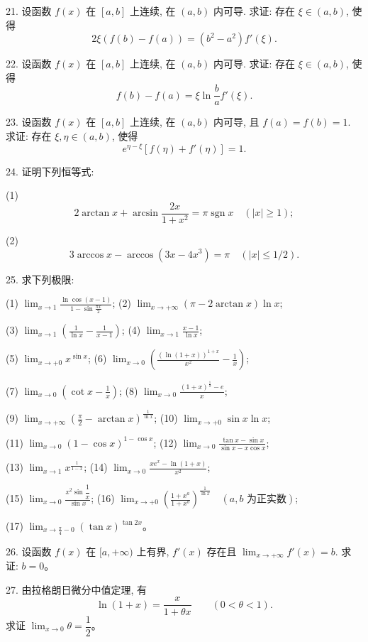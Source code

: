 \documentclass[UTF8,12pt,a4paper,fontset=fandol]{ctexart}
\begin{document}
21. 设函数 $f(x)$ 在 $[a,b]$ 上连续, 在 $(a,b)$ 内可导. 求证: 存在 $\xi\in(a,b)$, 使得
\[
  2\xi(f(b)-f(a))=(b^2-a^2)f'(\xi).
\]

22. 设函数 $f(x)$ 在 $[a,b]$ 上连续, 在 $(a,b)$ 内可导. 求证: 存在 $\xi\in(a,b)$, 使得
\[
  f(b)-f(a)=\xi\ln\frac ba f'(\xi).
\]

23. 设函数 $f(x)$ 在 $[a,b]$ 上连续, 在 $(a,b)$ 内可导, 且 $f(a)=f(b)=1$. 求证: 存在 $\xi,\eta\in(a,b)$, 使得
\[
  e^{\eta-\xi}[f(\eta)+f'(\eta)]=1.
\]

24. 证明下列恒等式:

(1)
\[
  2\arctan x+\arcsin\frac{2x}{1+x^2}=\pi\operatorname{sgn}x\quad (|x|\geqslant1);
\]

(2)
\[
  3\arccos x-\arccos(3x-4x^3)=\pi\quad (|x|\leqslant1/2).
\]

25. 求下列极限:

(1) $\displaystyle\lim_{x\to1}\frac{\ln\cos(x-1)}{1-\sin\frac{\pi x}2}$;\qquad
(2) $\displaystyle\lim_{x\to+\infty}(\pi-2\arctan x)\ln x$;

(3) $\displaystyle\lim_{x\to1}\left(\frac1{\ln x}-\frac1{x-1}\right)$;\qquad
(4) $\displaystyle\lim_{x\to1}\frac{x-1}{\ln x}$;

(5) $\displaystyle\lim_{x\to+0}x^{\sin x}$;\qquad
(6) $\displaystyle\lim_{x\to0}\left(\frac{(\ln(1+x))^{1+x}}{x^2}-\frac1x\right)$;

(7) $\displaystyle\lim_{x\to0}\left(\cot x-\frac1x\right)$;\qquad
(8) $\displaystyle\lim_{x\to0}\frac{(1+x)^{\frac1x}-e}{x}$;

(9) $\displaystyle\lim_{x\to+\infty}\left(\frac\pi2-\arctan x\right)^{\frac1{\ln x}}$;\qquad
(10) $\displaystyle\lim_{x\to+0}\sin x\ln x$;

(11) $\displaystyle\lim_{x\to0}(1-\cos x)^{1-\cos x}$;\qquad
(12) $\displaystyle\lim_{x\to0}\frac{\tan x-\sin x}{\sin x-x\cos x}$;

(13) $\displaystyle\lim_{x\to1}x^{\frac1{1-x}}$;\qquad
(14) $\displaystyle\lim_{x\to0}\frac{xe^x-\ln(1+x)}{x^2}$;

(15) $\displaystyle\lim_{x\to0}\frac{x^2\sin\dfrac1x}{\sin x}$;\qquad
(16) $\displaystyle\lim_{x\to+0}\left(\frac{1+x^a}{1+x^b}\right)^{\frac1{\ln x}}\quad (a,b\text{ 为正实数})$;

(17) $\displaystyle\lim_{x\to\frac\pi4-0}(\tan x)^{\tan 2x}$。

26. 设函数 $f(x)$ 在 $[a,+\infty)$ 上有界, $f'(x)$ 存在且 $\lim_{x\to+\infty}f'(x)=b$. 求证: $b=0$。

27. 由拉格朗日微分中值定理, 有
\[
  \ln(1+x)=\frac{x}{1+\theta x}\qquad (0<\theta<1).
\]
求证 $\lim_{x\to0}\theta=\dfrac12$。
\end{document}

